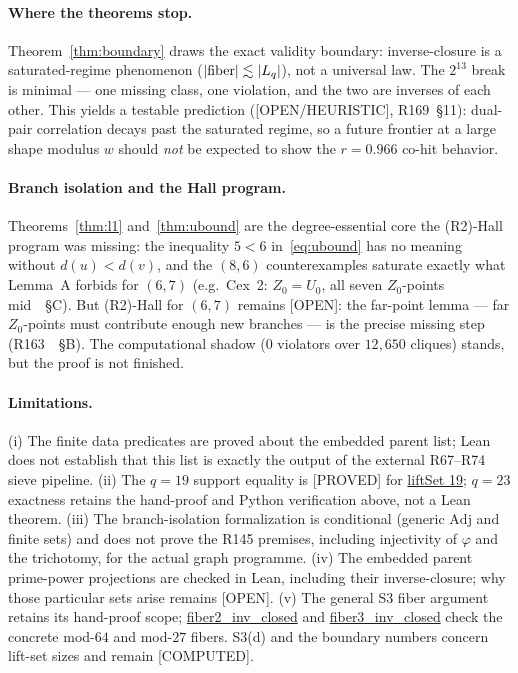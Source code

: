 \documentclass[11pt,a4paper]{article}
\theoremstyle{definition}
\begin{document}
\paragraph{Where the theorems stop.} Theorem~\ref{thm:boundary} draws the
exact validity boundary: inverse-closure is a saturated-regime
phenomenon ($|{\rm fiber}|\lesssim|L_q|$), not a universal law. The
$2^{13}$ break is minimal --- one missing class, one violation, and the
two are inverses of each other. This yields a testable prediction
([OPEN/HEURISTIC], R169~\S11): dual-pair correlation decays past the
saturated regime, so a future frontier at a large shape modulus $w$
should \emph{not} be expected to show the $r=0.966$ co-hit behavior.

\paragraph{Branch isolation and the Hall program.} Theorems~\ref{thm:l1}
and~\ref{thm:ubound} are the degree-essential core the (R2)-Hall
program was missing: the inequality $5<6$ in~\eqref{eq:ubound} has no
meaning without $d(u)<d(v)$, and the $(8,6)$ counterexamples saturate
exactly what Lemma~A forbids for $(6,7)$ (e.g.\ Cex~2:
$Z_0=U_0$, all seven $Z_0$-points mid~\cite{R163}~\S C). But (R2)-Hall
for $(6,7)$ remains [OPEN]: the far-point lemma ---
far $Z_0$-points must contribute enough new branches --- is the precise
missing step (R163~\cite{R163}~\S B). The computational shadow
($0$ violators over $12{,}650$ cliques) stands, but the proof is not
finished.

\paragraph{Limitations.} (i) The finite data predicates are proved
about the embedded parent list; Lean does not establish that this list
is exactly the output of the external R67--R74 sieve pipeline.
(ii) The $q=19$ support equality is [PROVED] for \url{liftSet 19};
$q=23$ exactness retains the hand-proof and Python verification above,
not a Lean theorem. (iii) The branch-isolation formalization is
conditional (generic $\mathrm{Adj}$ and finite sets) and does not prove
the R145 premises, including injectivity of $\varphi$ and the
trichotomy, for the actual graph programme. (iv) The embedded parent
prime-power projections are checked in Lean, including their
inverse-closure; why those particular sets arise remains [OPEN].
(v) The general S3 fiber argument retains its hand-proof scope;
\url{fiber2_inv_closed} and \url{fiber3_inv_closed} check the concrete
mod-$64$ and mod-$27$ fibers. S3(d) and the boundary numbers concern
lift-set sizes and remain [COMPUTED].
\end{document}
